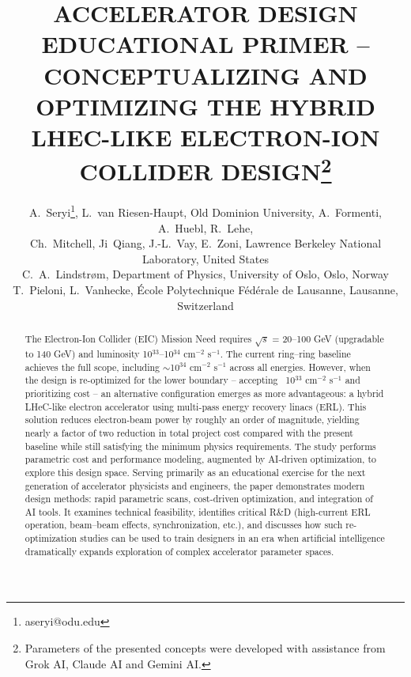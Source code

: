 \documentclass[%
               refpage       %
               hyphens,      %
               ]{jacow}
\begin{document}
\title{ACCELERATOR DESIGN EDUCATIONAL PRIMER – CONCEPTUALIZING AND OPTIMIZING THE HYBRID LHEC-LIKE ELECTRON-ION COLLIDER DESIGN\thanks{Parameters of the presented concepts were developed with assistance from Grok AI, Claude AI and Gemini AI.}}

\author{A.~Seryi\thanks{aseryi@odu.edu}, L.~van Riesen-Haupt, Old Dominion University,  
A.~Formenti, A.~Huebl, R.~Lehe, \\
Ch.~Mitchell, Ji~Qiang, J.-L.~Vay, E.~Zoni, Lawrence Berkeley National Laboratory, United States\\ 
C.~A.~Lindstrøm, Department of Physics, University of Oslo, Oslo, Norway\\ 
T.~Pieloni, L.~Vanhecke, École Polytechnique Fédérale de Lausanne, Lausanne, Switzerland}

\maketitle


\begin{abstract}
The Electron-Ion Collider (EIC) Mission Need requires $\sqrt{s}$ = 20–100 GeV (upgradable to 140 GeV) and luminosity 10$^{33}$–10$^{34}$ cm$^{-2}$ s$^{-1}$. The current ring--ring baseline achieves the full scope, including $\sim$10$^{34}$ cm$^{-2}$ s$^{-1}$ across all energies. However, when the design is re-optimized for the lower boundary -- accepting ~10$^{33}$ cm$^{-2}$ s$^{-1}$ and prioritizing cost -- an alternative configuration emerges as more advantageous: a hybrid LHeC-like electron accelerator using multi-pass energy recovery linacs (ERL).
This solution reduces electron-beam power by roughly an order of magnitude, yielding nearly a factor of two reduction in total project cost compared with the present baseline while still satisfying the minimum physics requirements. The study performs parametric cost and performance modeling, augmented by AI-driven optimization, to explore this design space.
Serving primarily as an educational exercise for the next generation of accelerator physicists and engineers, the paper demonstrates modern design methods: rapid parametric scans, cost-driven optimization, and integration of AI tools. It examines technical feasibility, identifies critical R\&D (high-current ERL operation, beam--beam effects, synchronization, etc.), and discusses how such re-optimization studies can be used to train designers in an era when artificial intelligence dramatically expands exploration of complex accelerator parameter spaces.
\end{abstract}
\end{document}
